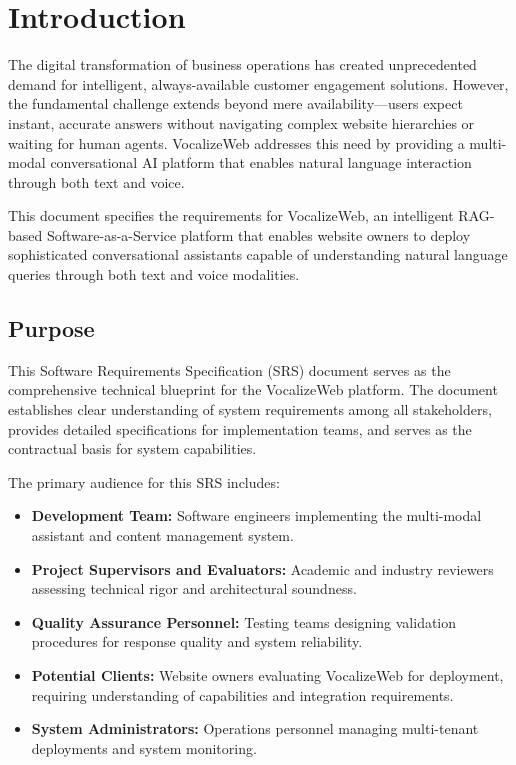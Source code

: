 \chapter{Introduction}

The digital transformation of business operations has created unprecedented demand for intelligent, always-available customer engagement solutions. However, the fundamental challenge extends beyond mere availability---users expect instant, accurate answers without navigating complex website hierarchies or waiting for human agents. VocalizeWeb addresses this need by providing a multi-modal conversational AI platform that enables natural language interaction through both text and voice.

This document specifies the requirements for VocalizeWeb, an intelligent RAG-based Software-as-a-Service platform that enables website owners to deploy sophisticated conversational assistants capable of understanding natural language queries through both text and voice modalities.

\section{Purpose}

This Software Requirements Specification (SRS) document serves as the comprehensive technical blueprint for the VocalizeWeb platform. The document establishes clear understanding of system requirements among all stakeholders, provides detailed specifications for implementation teams, and serves as the contractual basis for system capabilities.

The primary audience for this SRS includes:

\begin{itemize}[leftmargin=*]
    \item \textbf{Development Team:} Software engineers implementing the multi-modal assistant and content management system.
    \item \textbf{Project Supervisors and Evaluators:} Academic and industry reviewers assessing technical rigor and architectural soundness.
    \item \textbf{Quality Assurance Personnel:} Testing teams designing validation procedures for response quality and system reliability.
    \item \textbf{Potential Clients:} Website owners evaluating VocalizeWeb for deployment, requiring understanding of capabilities and integration requirements.
    \item \textbf{System Administrators:} Operations personnel managing multi-tenant deployments and system monitoring.
\end{itemize}

